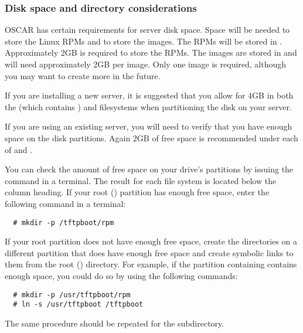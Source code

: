 
\subsubsection{Disk space and directory considerations}
\label{det:serverdiskpar}

OSCAR has certain requirements for server disk space. Space will be
needed to store the Linux RPMs and to store the images.  The RPMs will
be stored in . Approximately 2GB is required to
store the RPMs.  The images are stored in 
and will need approximately 2GB per image. Only one image is required,
although you may want to create more in the future.

If you are installing a new server, it is suggested that you allow for
4GB in both the \file{/} (which contains ) and
 filesystems when partitioning the disk on your server.

If you are using an existing server, you will need to verify that you
have enough space on the disk partitions.  Again 2GB of free space is
recommended under each of \file{/} and .

You can check the amount of free space on your drive's partitions by
issuing the command  in a terminal.  The result for each
file system is located below the  column heading. If
your root (\file{/}) partition has enough free space, enter the
following command in a terminal:

\begin{verbatim}
  # mkdir -p /tftpboot/rpm
\end{verbatim}
  
If your root partition does not have enough free space, create the
directories on a different partition that does have enough free space
and create symbolic links to them from the root (\file{/}) directory.
For example, if the partition containing  contains enough
space, you could do so by using the following commands:

\begin{verbatim}
  # mkdir -p /usr/tftpboot/rpm
  # ln -s /usr/tftpboot /tftpboot
\end{verbatim}

The same procedure should be repeated for the
 subdirectory.

    
